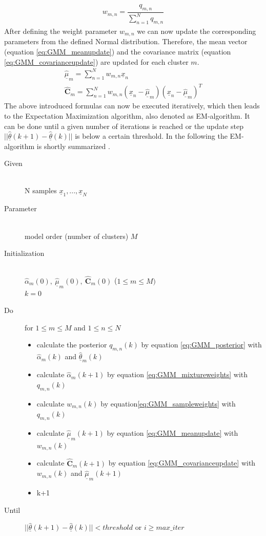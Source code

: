 \documentclass[12pt,DIV14,BCOR12mm,a4paper,footexclude,headinclude,halfparskip-,twoside,openright,cleardoubleempty,idxtotoc,bibtotoc,listtotoc]{scrreprt} %
\numberwithin{equation}{chapter}
\begin{document}
\begin{align}
	w_{m,n} = \dfrac{q_{m,n}}{\sum_{n=1}^{N}q_{m,n}}\label{eq:GMM_sampleweights}
\end{align}
After defining the weight parameter $w_{m,n}$ we can now update the corresponding parameters from the defined Normal distribution. Therefore, the mean vector (equation \ref{eq:GMM_meanupdate}) and the covariance matrix (equation \ref{eq:GMM_covarianceupdate}) are updated for each cluster $m$.
\begin{align}
	\hat{\underline{\mu}}_m = \sum_{n=1}^{N}w_{m,n}\underline{x}_n\label{eq:GMM_meanupdate}\\
	\hat{\mathbf{C}}_m = \sum_{n=1}^{N}w_{m,n}(\underline{x}_n-\hat{\underline{\mu}}_m)(\underline{x}_n-\hat{\underline{\mu}}_m)^{T}\label{eq:GMM_covarianceupdate}	
\end{align}
The above introduced formulas can now be executed iteratively, which then leads to the Expectation Maximization algorithm, also denoted as EM-algorithm. It can be done until a given number of iterations is reached or the update step $||\hat{\underline{\theta}}(k+1) - \hat{\underline{\theta}}(k)||$ is below a certain threshold. In the following the EM-algorithm is shortly summarized \cite{LectureNotes_DPR}.
\begin{description}
	\item[Given]\hfill \\
		N samples $\underline{x}_{1},...,\underline{x}_{N}$
	\item[Parameter]\hfill \\
		model order (number of clusters) $M$
	\item[Initialization]\hfill \\
		$\hat{\alpha}_m(0),\ \hat{\underline{\mu}}_m(0),\ \hat{\mathbf{C}}_m(0)$ ($1 \leq m \leq M)$\\
		$k = 0$
	\item[Do]  for $1 \leq m \leq M$ and $1 \leq n \leq N$\hfill
		\begin{itemize}
			\item calculate the posterior $q_{m,n}(k)$ by equation \ref{eq:GMM_posterior} with $\hat{\alpha}_m(k)$ and $\hat{\underline{\theta}}_m(k)$
			\item calculate $\hat{\alpha}_m(k+1)$ by equation \ref{eq:GMM_mixtureweights} with $q_{m,n}(k)$
			\item calculate $w_{m,n}(k)$ by equation\ref{eq:GMM_sampleweights} with $q_{m,n}(k)$
			\item calculate $\hat{\underline{\mu}}_m(k+1)$ by equation \ref{eq:GMM_meanupdate} with $w_{m,n}(k)$
			\item calculate $\hat{\mathbf{C}}_m(k+1)$ by equation \ref{eq:GMM_covarianceupdate} with $w_{m,n}(k)$ and $\hat{\underline{\mu}}_m(k+1)$
			\item k+1
		\end{itemize}
	\item[Until] $||\hat{\underline{\theta}}(k+1) - \hat{\underline{\theta}}(k)|| < threshold$ or $i \geq max\_iter$
\end{description}
\end{document}
